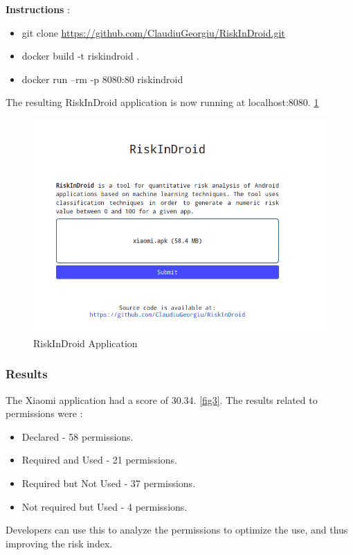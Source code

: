 \documentclass[runningheads]{llncs}
\begin{document}
\textbf{Instructions} :
\begin{itemize}
    \item git clone \url{https://github.com/ClaudiuGeorgiu/RiskInDroid.git}
    \item docker build -t riskindroid .
    \item docker run --rm -p 8080:80 riskindroid
\end{itemize}

The resulting RiskInDroid application is now running at localhost:8080. \ref{fig2}

\begin{figure}
    \includegraphics[width=\textwidth]{images/xiaomi-1.png}
    \caption{RiskInDroid Application} \label{fig2}
\end{figure}

\subsubsection{Results}
The Xiaomi application had a score of 30.34. \ref{fig3}.
The results related to permissions were :
\begin{itemize}
    \item Declared - 58 permissions.
    \item Required and Used - 21 permissions.
    \item Required but Not Used - 37 permissions.
    \item Not required but Used - 4 permissions.
\end{itemize}

Developers can use this to analyze the permissions to optimize the use, and thus improving the risk index.
\end{document}
